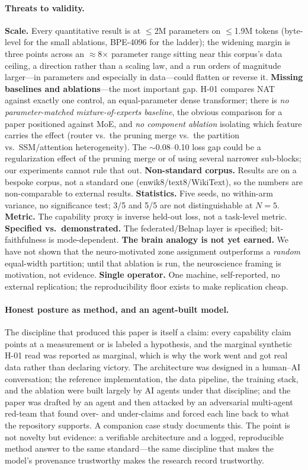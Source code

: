 \documentclass[11pt]{article}
\begin{document}
\paragraph{Threats to validity.}
\textbf{Scale.} Every quantitative result is at $\le$2M parameters on $\le$1.9M tokens (byte-level for
the small ablations, BPE-4096 for the ladder); the widening margin is three points across an
$\approx$8$\times$ parameter range sitting near this corpus's data ceiling, a direction rather than a
scaling law, and a run orders of magnitude larger---in parameters and especially in data---could flatten
or reverse it. \textbf{Missing baselines and ablations}---the most important
gap. H-01 compares NAT against exactly one control, an equal-parameter dense transformer; there is
\emph{no parameter-matched mixture-of-experts baseline}, the obvious comparison for a paper positioned
against MoE, and \emph{no component ablation} isolating which feature carries the effect (router vs.\
the pruning merge vs.\ the partition vs.\ SSM/attention heterogeneity). The $\sim$0.08--0.10 loss gap
could be a regularization effect of the pruning merge or of using several narrower sub-blocks; our
experiments cannot rule that out. \textbf{Non-standard corpus.} Results are on a bespoke corpus, not
a standard one (enwik8/text8/WikiText), so the numbers are non-comparable to external results.
\textbf{Statistics.} Five seeds, no within-arm variance, no significance test; 3/5 and 5/5 are not
distinguishable at $N{=}5$. \textbf{Metric.} The capability proxy is inverse held-out loss, not a
task-level metric. \textbf{Specified vs.\ demonstrated.} The federated/Belnap layer is specified;
bit-faithfulness is mode-dependent. \textbf{The brain analogy is not yet earned.} We have not shown
that the neuro-motivated zone assignment outperforms a \emph{random} equal-width partition; until that
ablation is run, the neuroscience framing is motivation, not evidence. \textbf{Single operator.} One
machine, self-reported, no external replication; the reproducibility floor exists to make replication
cheap.

\paragraph{Honest posture as method, and an agent-built model.}
The discipline that produced this paper is itself a claim: every capability claim points at a
measurement or is labeled a hypothesis, and the marginal synthetic H-01 read was reported as marginal,
which is why the work went and got real data rather than declaring victory. The architecture was
designed in a human--AI conversation; the reference implementation, the data pipeline, the training
stack, and the ablation were built largely by AI agents under that discipline; and the paper was
drafted by an agent and then attacked by an adversarial multi-agent red-team that found over- and
under-claims and forced each line back to what the repository supports. A companion case study
documents this. The point is not novelty but evidence: a verifiable architecture and a logged,
reproducible method answer to the same standard---the same discipline that makes the model's
provenance trustworthy makes the research record trustworthy.
\end{document}
